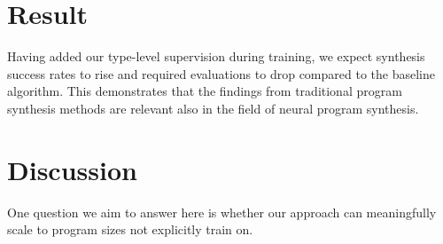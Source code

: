 \documentclass{article}
\begin{document}

\section{Result}

Having added our type-level supervision during training, we expect synthesis success rates to rise and required evaluations to drop compared to the baseline algorithm.
This demonstrates that the findings from traditional program synthesis methods are relevant also in the field of neural program synthesis.


\section{Discussion}

One question we aim to answer here is whether our approach can meaningfully scale to program sizes not explicitly train on.

\nocite{*}


\end{document}
